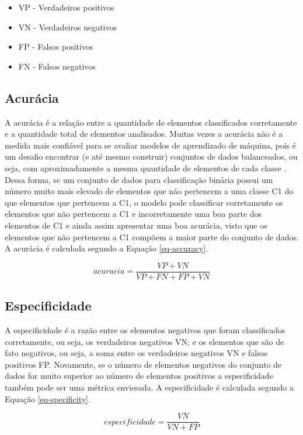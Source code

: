  \begin{itemize}
   \item VP - Verdadeiros positivos
   \item VN - Verdadeiros negativos
   \item FP - Falsos positivos
   \item FN - Falsos negativos
 \end{itemize}
   
\subsection{Acurácia}
A acurácia é a relação entre a quantidade de elementos classificados corretamente e a quantidade total de elementos analisados. Muitas vezes a acurácia não é a medida mais confiável para se avaliar modelos de aprendizado de máquina, pois é um desafio encontrar (e até mesmo construir) conjuntos de dados balanceados, ou seja, com aproximadamente a mesma quantidade de elementos de cada classe \cite{9075071}. Dessa forma, se um conjunto de dados para classificação binária possui um número muito mais elevado de elementos que não pertencem a uma classe C1 do que elementos que pertencem a C1, o modelo pode classificar corretamente os elementos que não pertencem a C1 e incorretamente uma boa parte dos elementos de C1 e ainda assim apresentar uma boa acurácia, visto que os elementos que não pertencem a C1 compõem a maior parte do conjunto de dados. 
A acurácia é calculada segundo a Equação \ref{eq-accuracy}.

\begin{equation}
acuracia = \frac{VP + VN}{VP + FN + FP + VN}
\label{eq-accuracy}
\end{equation}

\subsection{Especificidade}
A especificidade é a razão entre os elementos negativos que foram classificados corretamente, ou seja, os verdadeiros negativos VN; e os elementos que são de fato negativos, ou seja, a soma entre os verdadeiros negativos VN e falsos positivos FP.
Novamente, se o número de elementos negativos do conjunto de dados for muito superior ao número de elementos positivos a especificidade também pode ser uma métrica enviesada. 
A especificidade é calculada segundo a Equação \ref{eq-specificity}.

\begin{equation}
especificidade = \frac{VN}{VN + FP}
\label{eq-specificity}
\end{equation}

